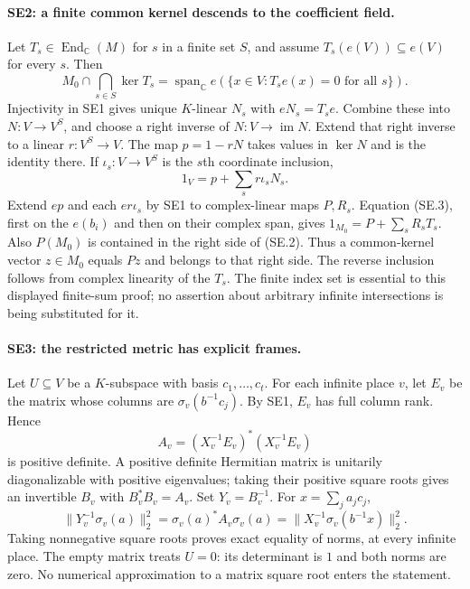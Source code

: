 \paragraph{SE2: a finite common kernel descends to the coefficient field.}
Let $T_s\in\operatorname{End}_{\mathbb C}(M)$ for $s$ in a finite set
$S$, and assume $T_s(e(V))\subseteq e(V)$ for every $s$. Then
\[
 M_0\cap\bigcap_{s\in S}\ker T_s
 =\operatorname{span}_{\mathbb C}
 e\left(\{x\in V:T_s e(x)=0\text{ for all }s\}\right).
 \tag{SE.2}
\]
Injectivity in SE1 gives unique $K$-linear $N_s$ with $eN_s=T_se$.
Combine these into $N:V\to V^S$, and choose a right inverse of
$N:V\to\operatorname{im}N$. Extend that right inverse to a linear
$r:V^S\to V$. The map $p=1-rN$ takes values in $\ker N$ and is the
identity there. If $\iota_s:V\to V^S$ is the $s$th coordinate inclusion,
\[
 1_V=p+\sum_s r\iota_sN_s.
 \tag{SE.3}
\]
Extend $ep$ and each $er\iota_s$ by SE1 to complex-linear maps $P,R_s$.
Equation (SE.3), first on the $e(b_i)$ and then on their complex span,
gives $1_{M_0}=P+\sum_sR_sT_s$. Also $P(M_0)$ is contained in the
right side of (SE.2). Thus a common-kernel vector $z\in M_0$ equals
$Pz$ and belongs to that right side. The reverse inclusion follows from
complex linearity of the $T_s$. The finite index set is essential to
this displayed finite-sum proof; no assertion about arbitrary infinite
intersections is being substituted for it.

\paragraph{SE3: the restricted metric has explicit frames.}
Let $U\subseteq V$ be a $K$-subspace with basis $c_1,\ldots,c_t$. For
each infinite place $v$, let $E_v$ be the matrix whose columns are
$\sigma_v(b^{-1}c_j)$. By SE1, $E_v$ has full column rank. Hence
\[
 A_v=(X_v^{-1}E_v)^*(X_v^{-1}E_v)
 \tag{SE.4}
\]
is positive definite. A positive definite Hermitian matrix is unitarily
diagonalizable with positive eigenvalues; taking their positive square
roots gives an invertible $B_v$ with $B_v^*B_v=A_v$. Set $Y_v=B_v^{-1}$.
For $x=\sum_j a_jc_j$,
\[
 \|Y_v^{-1}\sigma_v(a)\|_2^2
 =\sigma_v(a)^*A_v\sigma_v(a)
 =\|X_v^{-1}\sigma_v(b^{-1}x)\|_2^2.
 \tag{SE.5}
\]
Taking nonnegative square roots proves exact equality of norms, at
every infinite place. The empty matrix treats $U=0$: its determinant
is $1$ and both norms are zero. No numerical approximation to a matrix
square root enters the statement.

